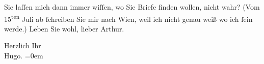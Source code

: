\pstart
           Sie laſſen mich dann immer wiſſen, wo Sie Briefe finden wollen, nicht wahr? (Vom
                     15\textsuperscript{ten} Juli ab{ }ſchreiben Sie mir nach
                  Wien, weil ich nicht genau weiß wo ich{ }ſein
               werde.) Leben Sie wohl, lieber Arthur.\pend
           
\pstart
           Herzlich Ihr{\\[\baselineskip]}\spacefill\mbox{Hugo.}\pend
           \leftskip=0em{}\endnumbering{}  \newcommand{\dateiname}{L00556}\newcommand{\titel}{Hugo von Hofmannsthal an Arthur Schnitzler, 27. 6. [1896]}\newcommand{\editorInnen}{Martin Anton Müller und Gerd-Hermann Susen}
